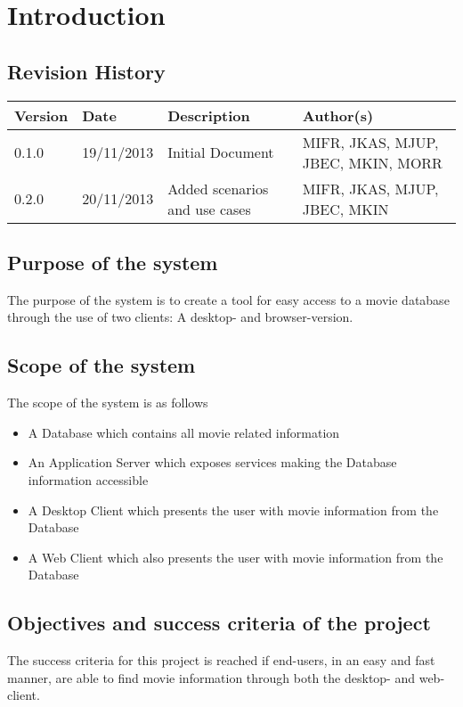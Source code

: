\chapter{Introduction}
\label{sec:introduction}

\section{Revision History}
\begin{center}
    \begin{tabular}{ | l | l | p{6cm} | p{4cm} |}
    \hline
    Version & Date & Description & Author(s) \\ \hline
    0.1.0 & 19/11/2013 & Initial Document & MIFR, JKAS, MJUP, JBEC, MKIN, MORR
    \\ \hline
    0.2.0 & 20/11/2013 & Added scenarios and use cases & MIFR, JKAS, MJUP, JBEC, MKIN
    \end{tabular}
\end{center}

\section{Purpose of the system}

The purpose of the system is to create a tool for easy access to a movie database through the use of two clients: A desktop- and browser-version.


\section{Scope of the system}

The scope of the system is as follows

\begin{itemize}
\item A Database which contains all movie related information
\item An Application Server which exposes services making the Database information accessible
\item A Desktop Client which presents the user with movie information from the Database
\item A Web Client which also presents the user with movie information from the Database
\end{itemize} 

\section{Objectives and success criteria of the project}

The success criteria for this project is reached if end-users, in an easy and fast manner, are able to find movie information through both the desktop- and web-client.

